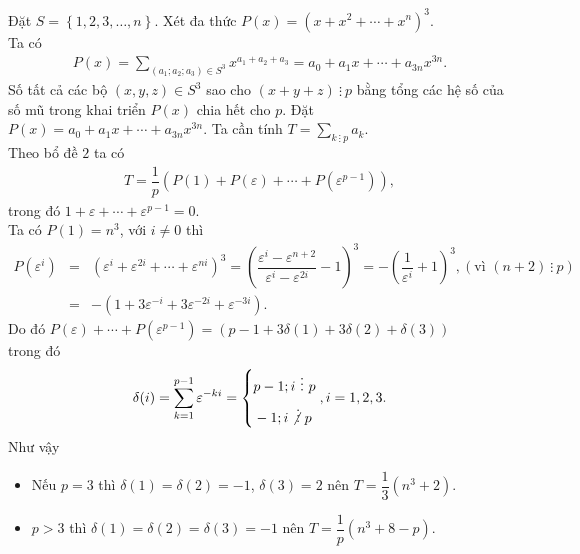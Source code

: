 \begin{bt}
{		Đặt $S=\left\{1,2,3,\ldots,n \right\}$. Xét đa thức $P(x)=(x+x^2+\cdots+x^n)^3$.\\
		Ta có 
		\begin{eqnarray*}
			P(x)=\displaystyle\sum\limits_{(a_1;a_2;a_3)\in S^3} x^{a_1+a_2+a_3}=a_0+a_1x+\cdots+a_{3n}x^{3n}.
		\end{eqnarray*}
		Số tất cả các bộ $(x,y,z)\in S^3$ sao cho $\left(x+y+z\right)\ \vdots\ p$ bằng tổng các hệ số của số mũ trong khai triển $P(x)$ chia hết cho $p$. Đặt $P(x)=a_0+a_1x+\cdots+a_{3n}x^{3n}$. Ta cần tính $T=\displaystyle\sum\limits_{k\ \vdots\ p}a_k$.\\
		Theo bổ đề $2$ ta có
		\begin{eqnarray*}
			T=\dfrac{1}{p}\left(P(1)+P(\varepsilon)+\cdots+P(\varepsilon ^{p-1})\right),
		\end{eqnarray*}
		trong đó $1+\varepsilon+\cdots+\varepsilon ^{p-1}=0$.\\
		Ta có $P(1)=n^3$, với $i\ne 0$ thì
		\begin{eqnarray*}
			P(\varepsilon ^i)&=&\left(\varepsilon ^i+\varepsilon ^{2i}+\cdots +\varepsilon ^{ni}\right)^3=\left(\dfrac{\varepsilon ^i-\varepsilon ^{n+2}}{\varepsilon ^i-\varepsilon ^{2i}}-1\right)^3=-\left(\dfrac{1}{\varepsilon ^i}+1\right)^3, \left(\text{vì } \left(n+2\right)\ \vdots\ p \right)\\
			&=& -\left(1+3\varepsilon ^{-i}+3\varepsilon ^{-2i}+\varepsilon ^{-3i}\right).
		\end{eqnarray*}
		Do đó $P(\varepsilon)+\cdots +P(\varepsilon ^{p-1})=\left(p-1+3\delta (1)+3\delta (2)+\delta (3)\right)$\\
		trong đó
		\begin{eqnarray*}
			\delta (i)=\displaystyle\sum\limits_{k=1}^{p-1}\varepsilon ^{-ki}=\left\{\begin{aligned}&p-1;i\ \vdots\ p\\&-1;i\not \vdots\ p\end{aligned}\right., i=1, 2, 3.
		\end{eqnarray*}
		Như vậy 
		\begin{itemize}
			\item Nếu $p=3$ thì $\delta (1)=\delta (2)=-1$, $\delta (3)=2$ nên $T=\dfrac{1}{3}\left(n^3+2\right).$\\
			\item $p>3$ thì $\delta (1)=\delta (2)=\delta (3)=-1$ nên $T=\dfrac{1}{p}\left(n^3+8-p\right).$
		\end{itemize}
	}
\end{bt}

